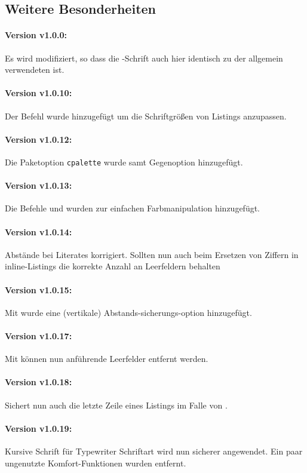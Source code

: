 \documentclass{sopra-base}
\begin{document}
\subsection{Weitere Besonderheiten}
\paragraph{Version v1.0.0:} Es wird  modifiziert, so dass die -Schrift auch hier identisch zu der allgemein verwendeten ist.
\paragraph{Version v1.0.10:} Der Befehl  wurde hinzugefügt um die
Schriftgrößen von Listings anzupassen.
\paragraph{Version v1.0.12:} Die Paketoption \texttt{cpalette} wurde samt Gegenoption hinzugefügt.
\paragraph{Version v1.0.13:} Die Befehle  und  wurden zur einfachen Farbmanipulation hinzugefügt.
\paragraph{Version v1.0.14:} Abstände bei Literates korrigiert. Sollten nun auch beim Ersetzen von Ziffern in inline-Listings die korrekte Anzahl an Leerfeldern behalten
\paragraph{Version v1.0.15:} Mit  wurde eine (vertikale) Abstands-sicherungs-option hinzugefügt.
\paragraph{Version v1.0.17:} Mit  können nun anführende Leerfelder entfernt werden.
\paragraph{Version v1.0.18:}
Sichert nun auch die letzte Zeile eines Listings im Falle von .
\paragraph{Version v1.0.19:}
Kursive Schrift für Typewriter Schriftart wird nun sicherer angewendet. Ein paar ungenutzte Komfort-Funktionen wurden entfernt.
\end{document}
